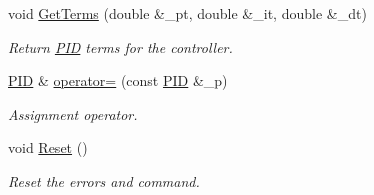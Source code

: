 \begin{DoxyCompactItemize}
void \hyperlink{classnubot_1_1PID_a012fe343ac6256b82f97f6e0ce2710f7}{Get\-Terms} (double \&\-\_\-pt, double \&\-\_\-it, double \&\-\_\-dt)
\begin{DoxyCompactList}\small\item\em Return \hyperlink{classnubot_1_1PID}{P\-I\-D} terms for the controller. \end{DoxyCompactList}\item 
\hyperlink{classnubot_1_1PID}{P\-I\-D} \& \hyperlink{classnubot_1_1PID_add67e35a4895870bb49e62479232cf2f}{operator=} (const \hyperlink{classnubot_1_1PID}{P\-I\-D} \&\-\_\-p)
\begin{DoxyCompactList}\small\item\em Assignment operator. \end{DoxyCompactList}\item 
void \hyperlink{classnubot_1_1PID_a9f949fd4445477ee9bf1af2bfa3e1a84}{Reset} ()
\begin{DoxyCompactList}\small\item\em Reset the errors and command. \end{DoxyCompactList}\end{DoxyCompactItemize}
